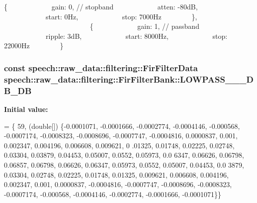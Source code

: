 \{             gain\+: 0, // stopband             atten\+: -\/80d\+B,             start\+: 0\+Hz,             stop\+: 7000\+Hz         \},                          \{             gain\+: 1, // passband             ripple\+: 3d\+B,             start\+: 8000\+Hz,             stop\+: 22000\+Hz         \} \hypertarget{classspeech_1_1raw__data_1_1filtering_1_1FirFilterBank_a83f13453e59bd6a8d00ba0a8ce9e67f6}{
\subsubsection[{L\+O\+W\+P\+A\+S\+S\+\_\+44100\+\_\+1000\+\_\+3\+D\+B\+\_\+80\+D\+B}]{\setlength{\rightskip}{0pt plus 5cm}const {\bf speech\+::raw\+\_\+data\+::filtering\+::\+Fir\+Filter\+Data} speech\+::raw\+\_\+data\+::filtering\+::\+Fir\+Filter\+Bank\+::\+L\+O\+W\+P\+A\+S\+S\+\_\+\_\+\_\+D\+B\+\_\+D\+B\hspace{0.3cm}{\ttfamily [static]}}}\label{classspeech_1_1raw__data_1_1filtering_1_1FirFilterBank_a83f13453e59bd6a8d00ba0a8ce9e67f6}
{\bfseries Initial value\+:}
\begin{DoxyCode}
= \{
        59, (\textcolor{keywordtype}{double}[]) \{-0.0001071, -0.0001666, -0.0002774, -0.0004146, -0.000568, -0.0007174, -0.0008323, 
      -0.0008696,
                        -0.0007747, -0.0004816, 0.0000837, 0.001, 0.002347, 0.004196, 0.006608, 0.009621, 0
      .01325,
                        0.01748, 0.02225, 0.02748, 0.03304, 0.03879, 0.04453, 0.05007, 0.0552, 0.05973, 0.0
      6347,
                        0.06626,
                        0.06798, 0.06857, 0.06798, 0.06626, 0.06347, 0.05973, 0.0552, 0.05007, 0.04453, 0.0
      3879,
                        0.03304,
                        0.02748, 0.02225, 0.01748, 0.01325, 0.009621, 0.006608, 0.004196, 0.002347, 0.001, 
      0.0000837,
                        -0.0004816,
                        -0.0007747, -0.0008696, -0.0008323, -0.0007174, -0.000568, -0.0004146, -0.0002774, 
      -0.0001666,
                        -0.0001071\}\}
\end{DoxyCode}
